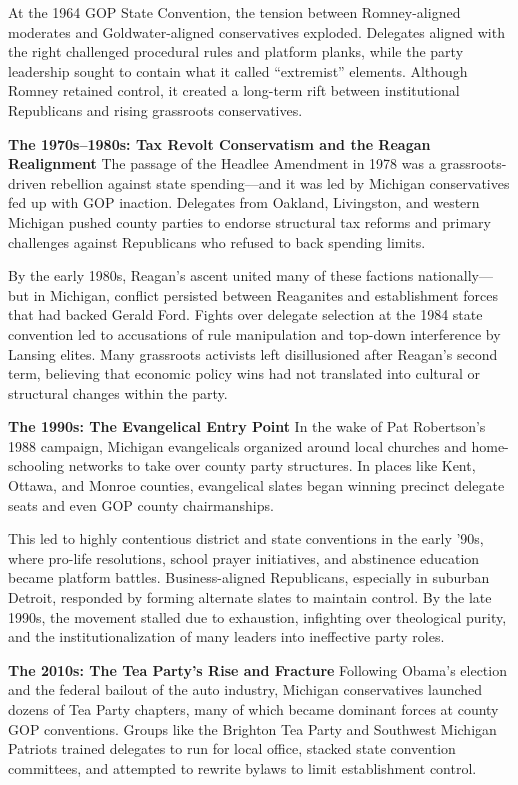 At the 1964 GOP State Convention, the tension between Romney-aligned moderates and Goldwater-aligned conservatives exploded. Delegates aligned with the right challenged procedural rules and platform planks, while the party leadership sought to contain what it called “extremist” elements. Although Romney retained control, it created a long-term rift between institutional Republicans and rising grassroots conservatives.

\textbf{The 1970s–1980s: Tax Revolt Conservatism and the Reagan Realignment}
The passage of the Headlee Amendment in 1978 was a grassroots-driven rebellion against state spending—and it was led by Michigan conservatives fed up with GOP inaction. Delegates from Oakland, Livingston, and western Michigan pushed county parties to endorse structural tax reforms and primary challenges against Republicans who refused to back spending limits.

By the early 1980s, Reagan’s ascent united many of these factions nationally—but in Michigan, conflict persisted between Reaganites and establishment forces that had backed Gerald Ford. Fights over delegate selection at the 1984 state convention led to accusations of rule manipulation and top-down interference by Lansing elites. Many grassroots activists left disillusioned after Reagan’s second term, believing that economic policy wins had not translated into cultural or structural changes within the party.

\textbf{The 1990s: The Evangelical Entry Point}
In the wake of Pat Robertson’s 1988 campaign, Michigan evangelicals organized around local churches and home-schooling networks to take over county party structures. In places like Kent, Ottawa, and Monroe counties, evangelical slates began winning precinct delegate seats and even GOP county chairmanships.

This led to highly contentious district and state conventions in the early ’90s, where pro-life resolutions, school prayer initiatives, and abstinence education became platform battles. Business-aligned Republicans, especially in suburban Detroit, responded by forming alternate slates to maintain control. By the late 1990s, the movement stalled due to exhaustion, infighting over theological purity, and the institutionalization of many leaders into ineffective party roles.

\textbf{The 2010s: The Tea Party’s Rise and Fracture}
Following Obama’s election and the federal bailout of the auto industry, Michigan conservatives launched dozens of Tea Party chapters, many of which became dominant forces at county GOP conventions. Groups like the Brighton Tea Party and Southwest Michigan Patriots trained delegates to run for local office, stacked state convention committees, and attempted to rewrite bylaws to limit establishment control.

